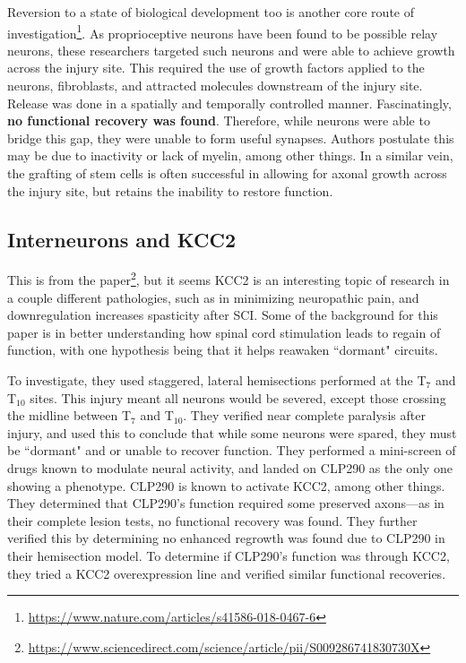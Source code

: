\documentclass[12pt]{report}
\begin{document}
Reversion to a state of biological development too is another core route of investigation\footnote{\url{https://www.nature.com/articles/s41586-018-0467-6}}. As proprioceptive neurons have been found to be possible relay neurons, these researchers targeted such neurons and were able to achieve growth across the injury site. This required the use of growth factors applied to the neurons, fibroblasts, and attracted molecules downstream of the injury site. Release was done in a spatially and temporally controlled manner. Fascinatingly, \textbf{no functional recovery was found}. Therefore, while neurons were able to bridge this gap, they were unable to form useful synapses. Authors postulate this may be due to inactivity or lack of myelin, among other things. In a similar vein, the grafting of stem cells is often successful in allowing for axonal growth across the injury site, but retains the inability to restore function.\newline

\subsection{Interneurons and KCC2}
\label{sec:KCC2}

This is from the paper\footnote{\url{https://www.sciencedirect.com/science/article/pii/S009286741830730X}}, but it seems KCC2 is an interesting topic of research in a couple different pathologies, such as in minimizing neuropathic pain, and downregulation increases spasticity after SCI. Some of the background for this paper is in better understanding how spinal cord stimulation leads to regain of function, with one hypothesis being that it helps reawaken ``dormant" circuits.\newline

To investigate, they used staggered, lateral hemisections performed at the T$_7$ and T$_{10}$ sites. This injury meant all neurons would be severed, except those crossing the midline between T$_7$ and T$_{10}$. They verified near complete paralysis after injury, and used this to conclude that while some neurons were spared, they must be ``dormant" and or unable to recover function. They performed a mini-screen of drugs known to modulate neural activity, and landed on CLP290 as the only one showing a phenotype. CLP290 is known to activate KCC2, among other things. They determined that CLP290's function required some preserved axons---as in their complete lesion tests, no functional recovery was found. They further verified this by determining no enhanced regrowth was found due to CLP290 in their hemisection model. To determine if CLP290's function was through KCC2, they tried a KCC2 overexpression line and verified similar functional recoveries.\newline
\end{document}
